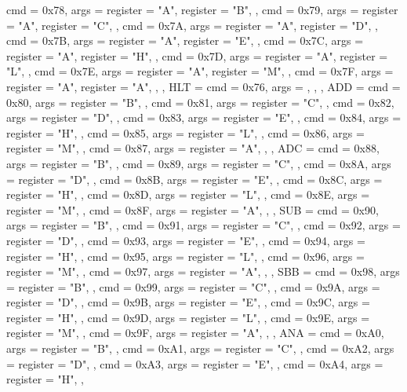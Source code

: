 {{        { cmd = 0x78, args = {{register = "A"}, {register = "B"}}, },
        { cmd = 0x79, args = {{register = "A"}, {register = "C"}}, },
        { cmd = 0x7A, args = {{register = "A"}, {register = "D"}}, },
        { cmd = 0x7B, args = {{register = "A"}, {register = "E"}}, },
        { cmd = 0x7C, args = {{register = "A"}, {register = "H"}}, },
        { cmd = 0x7D, args = {{register = "A"}, {register = "L"}}, },
        { cmd = 0x7E, args = {{register = "A"}, {register = "M"}}, },
        { cmd = 0x7F, args = {{register = "A"}, {register = "A"}}, },
    },
    HLT  = {
        {cmd = 0x76, args = {}, },
    },
    ADD  = {
        { cmd = 0x80, args = {{register = "B"}}, },
        { cmd = 0x81, args = {{register = "C"}}, },
        { cmd = 0x82, args = {{register = "D"}}, },
        { cmd = 0x83, args = {{register = "E"}}, },
        { cmd = 0x84, args = {{register = "H"}}, },
        { cmd = 0x85, args = {{register = "L"}}, },
        { cmd = 0x86, args = {{register = "M"}}, },
        { cmd = 0x87, args = {{register = "A"}}, },
    },
    ADC  = {
        { cmd = 0x88, args = {{register = "B"}}, },
        { cmd = 0x89, args = {{register = "C"}}, },
        { cmd = 0x8A, args = {{register = "D"}}, },
        { cmd = 0x8B, args = {{register = "E"}}, },
        { cmd = 0x8C, args = {{register = "H"}}, },
        { cmd = 0x8D, args = {{register = "L"}}, },
        { cmd = 0x8E, args = {{register = "M"}}, },
        { cmd = 0x8F, args = {{register = "A"}}, },
    },
    SUB  = {
        { cmd = 0x90, args = {{register = "B"}}, },
        { cmd = 0x91, args = {{register = "C"}}, },
        { cmd = 0x92, args = {{register = "D"}}, },
        { cmd = 0x93, args = {{register = "E"}}, },
        { cmd = 0x94, args = {{register = "H"}}, },
        { cmd = 0x95, args = {{register = "L"}}, },
        { cmd = 0x96, args = {{register = "M"}}, },
        { cmd = 0x97, args = {{register = "A"}}, },
    },
    SBB  = {
        { cmd = 0x98, args = {{register = "B"}}, },
        { cmd = 0x99, args = {{register = "C"}}, },
        { cmd = 0x9A, args = {{register = "D"}}, },
        { cmd = 0x9B, args = {{register = "E"}}, },
        { cmd = 0x9C, args = {{register = "H"}}, },
        { cmd = 0x9D, args = {{register = "L"}}, },
        { cmd = 0x9E, args = {{register = "M"}}, },
        { cmd = 0x9F, args = {{register = "A"}}, },
    },
    ANA  = {
        { cmd = 0xA0, args = {{register = "B"}}, },
        { cmd = 0xA1, args = {{register = "C"}}, },
        { cmd = 0xA2, args = {{register = "D"}}, },
        { cmd = 0xA3, args = {{register = "E"}}, },
        { cmd = 0xA4, args = {{register = "H"}}, },
}}
